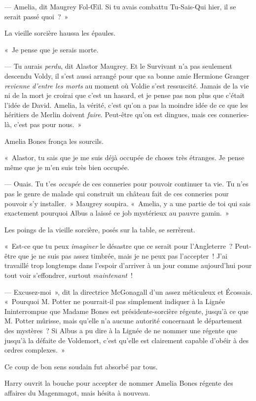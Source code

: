 --- Amelia, dit Maugrey Fol-Œil. Si tu avais combattu Tu-Sais-Qui hier, il se serait passé quoi~?~»

La vieille sorcière haussa les épaules.

«~Je pense que je serais morte.

--- Tu aurais \emph{perdu}, dit Alastor Maugrey. Et le Survivant n'a pas seulement descendu Voldy, il s'est aussi arrangé pour que sa bonne amie Hermione Granger \emph{revienne d'entre les morts} au moment où Voldie s'est ressuscité. Jamais de la vie ni de la mort je croirai que c'est un hasard, et je pense pas non plus que c'était l'idée de David. Amelia, la vérité, c'est qu'on a pas la moindre idée de ce que les héritiers de Merlin doivent \emph{faire}. Peut-être qu'on est dingues, mais ces conneries-là, c'est pas pour nous.~»

Amelia Bones fronça les sourcils.

«~Alastor, tu sais que je me suis déjà occupée de choses très étranges. Je pense même que je m'en suis très bien occupée.

--- Ouais. Tu t'es \emph{occupée} de ces conneries pour pouvoir continuer ta vie. Tu n'es pas le genre de malade qui construit un château fait de ces conneries pour pouvoir s'y installer.~» Maugrey soupira. «~Amelia, y a une partie de toi qui sais exactement pourquoi Albus a laissé ce job mystérieux au pauvre gamin.~»

Les poings de la vieille sorcière, posés sur la table, se serrèrent.

«~Est-ce que tu peux \emph{imaginer} le désastre que ce serait pour l'Angleterre~? Peut-être que je ne suis pas assez timbrée, mais je ne peux pas l'accepter~! J'ai travaillé trop longtemps dans l'espoir d'arriver à un jour comme aujourd'hui pour tout voir s'effondrer, surtout \emph{maintenant}~!

--- Excusez-moi~», dit la directrice McGonagall d'un assez méticuleux et Écossais. «~Pourquoi M. Potter ne pourrait-il pas simplement indiquer à la Lignée Ininterrompue que Madame Bones est présidente-sorcière régente, jusqu'à ce que M. Potter mûrisse, mais qu'elle n'a aucune autorité concernant le département des mystères~? Si Albus a pu dire à la Lignée de ne nommer une régente que jusqu'à la défaite de Voldemort, c'est qu'elle est clairement capable d’obéir à des ordres complexes.~»

Ce coup de bon sens soudain fut absorbé par tous.

Harry ouvrit la bouche pour accepter de nommer Amelia Bones régente des affaires du Magenmagot, mais hésita à nouveau.

